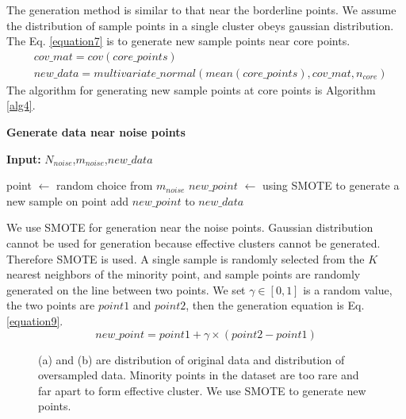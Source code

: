 \documentclass[ida]{iosart2x}
\begin{document}
The generation method is similar to that near the borderline points. 
We assume the distribution of sample points in a single cluster obeys gaussian distribution.
The Eq. \ref{equation7} is to generate new sample points near core points.
\begin{equation}
  \label{equation7}
  \begin{aligned}
    & cov\_mat=cov(core\_points) \\
    & new\_data=multivariate\_normal(mean(core\_points),cov\_mat,n_{core})
  \end{aligned}
\end{equation}
The algorithm for generating new sample points at core points is Algorithm \ref{alg4}.

\textbf{Generate data near noise points}
\begin{algorithm}[tb]
  \caption{$generate\_noise$}
  \label{alg5}
  \hspace*{0.02in} {\bf Input:} $N_{noise}$,$m_{noise}$,$new\_data$
  \begin{algorithmic}
    \State point $\leftarrow$ random choice from $m_{noise}$
    \State $new\_point$ $\leftarrow$ using SMOTE to generate a new sample on point
    \State add $new\_point$ to $new\_data$
    \EndFor
  \end{algorithmic}
\end{algorithm}
We use SMOTE for generation near the noise points.
Gaussian distribution cannot be used for generation because effective clusters cannot be generated. 
Therefore SMOTE is used.
A single sample is randomly selected from the $K$ nearest neighbors of the minority point, 
 and sample points are randomly generated on the line between two points.
 We set $\gamma \in [0,1]$ is a random value, the two points are $point1$ and $point2$,
 then the generation equation is Eq. \ref{equation9}.
 \begin{equation}
  \label{equation9}
  new\_point=point1+\gamma \times (point2-point1)
\end{equation}

\begin{figure}[tb]
  \centering
  \quad
  \caption{(a) and (b) are distribution of original data and distribution of oversampled data.
  Minority points in the dataset are too rare and far apart to form effective cluster. 
  We use SMOTE to generate new points.}
  \label{fig14}
  \end{figure}
\end{document}
